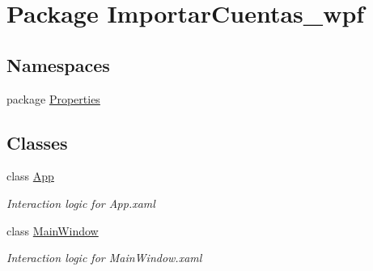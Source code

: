 \hypertarget{namespace_importar_cuentas__wpf}{\section{Package Importar\-Cuentas\-\_\-wpf}
\label{namespace_importar_cuentas__wpf}
}
\subsection*{Namespaces}
\begin{DoxyCompactItemize}
\item 
package \hyperlink{namespace_importar_cuentas__wpf_1_1_properties}{Properties}
\end{DoxyCompactItemize}
\subsection*{Classes}
\begin{DoxyCompactItemize}
\item 
class \hyperlink{class_importar_cuentas__wpf_1_1_app}{App}
\begin{DoxyCompactList}\small\item\em Interaction logic for App.\-xaml \end{DoxyCompactList}\item 
class \hyperlink{class_importar_cuentas__wpf_1_1_main_window}{Main\-Window}
\begin{DoxyCompactList}\small\item\em Interaction logic for Main\-Window.\-xaml \end{DoxyCompactList}\end{DoxyCompactItemize}

